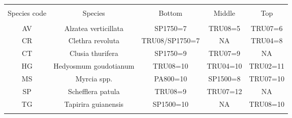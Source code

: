 
\begin{table}[!htbp] \centering 
  \caption{} 
  \label{species_elevcode_tally} 
\begin{tabular}{@{\extracolsep{5pt}} ccccc} 
\\[-1.8ex]\hline 
\hline \\[-1.8ex] 
Species code & Species & Bottom & Middle & Top \\ 
\hline \\[-1.8ex] 
AV & Alzatea verticillata & SP1750=7 & TRU08=5 & TRU07=6 \\ 
CR & Clethra revoluta & TRU08/SP1750=7 & NA & TRU04=8 \\ 
CT & Clusia thurifera & SP1750=9 & TRU07=9 & NA \\ 
HG & Hedyosmum goudotianum & TRU08=10 & TRU04=10 & TRU02=11 \\ 
MS & Myrcia spp. & PA800=10 & SP1500=8 & TRU07=10 \\ 
SP & Schefflera patula & TRU08=9 & TRU07=12 & NA \\ 
TG & Tapirira guianensis & SP1500=10 & NA & TRU08=10 \\ 
\hline \\[-1.8ex] 
\end{tabular} 
\end{table} 
